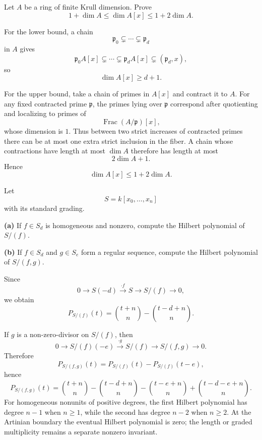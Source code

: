 \begin{problem}[CP-V-0083]
\label{prob:cp-v-0083}
Let \(A\) be a ring of finite Krull dimension. Prove
\[
1+\dim A\le \dim A[x]\le 1+2\dim A.
\]
\end{problem}

\begin{solution}
For the lower bound, a chain
\[
\mathfrak p_0\subsetneq\cdots\subsetneq\mathfrak p_d
\]
in \(A\) gives
\[
\mathfrak p_0A[x]\subsetneq\cdots\subsetneq
\mathfrak p_dA[x]\subsetneq(\mathfrak p_d,x),
\]
so
\[
\dim A[x]\ge d+1.
\]

For the upper bound, take a chain of primes in \(A[x]\) and contract it to
\(A\). For any fixed contracted prime \(\mathfrak p\), the primes lying over
\(\mathfrak p\) correspond after quotienting and localizing to primes of
\[
\operatorname{Frac}(A/\mathfrak p)[x],
\]
whose dimension is \(1\). Thus between two strict increases of contracted
primes there can be at most one extra strict inclusion in the fiber. A chain
whose contractions have length at most \(\dim A\) therefore has length at
most
\[
2\dim A+1.
\]
Hence
\[
\dim A[x]\le 1+2\dim A.
\]
\end{solution}


\begin{problem}[CP-V-0084]
\label{prob:cp-v-0084}
Let
\[
S=k[x_0,\dots,x_n]
\]
with its standard grading.

\textbf{(a)} If \(f\in S_d\) is homogeneous and nonzero, compute the Hilbert
polynomial of \(S/(f)\).

\textbf{(b)} If \(f\in S_d\) and \(g\in S_e\) form a regular sequence,
compute the Hilbert polynomial of \(S/(f,g)\).
\end{problem}

\begin{solution}
Since
\[
0\to S(-d)\xrightarrow{\cdot f}S\to S/(f)\to0,
\]
we obtain
\[
P_{S/(f)}(t)
=
\binom{t+n}{n}
-
\binom{t-d+n}{n}.
\]

If \(g\) is a non-zero-divisor on \(S/(f)\), then
\[
0\to S/(f)(-e)\xrightarrow{\cdot g}S/(f)
\to S/(f,g)\to0.
\]
Therefore
\[
P_{S/(f,g)}(t)
=
P_{S/(f)}(t)-P_{S/(f)}(t-e),
\]
hence
\[
P_{S/(f,g)}(t)
=
\binom{t+n}{n}
-\binom{t-d+n}{n}
-\binom{t-e+n}{n}
+\binom{t-d-e+n}{n}.
\]
For homogeneous nonunits of positive degrees, the first Hilbert
polynomial has degree \(n-1\) when \(n\ge1\), while the second has
degree \(n-2\) when \(n\ge2\). At the Artinian boundary the eventual
Hilbert polynomial is zero; the length or graded multiplicity remains
a separate nonzero invariant.
\end{solution}


